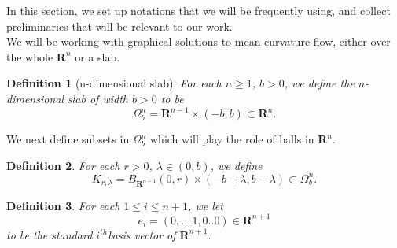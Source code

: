 \documentclass[pdflatex,sn-mathphys-num]{sn-jnl}%
\newtheorem{definition}{Definition}[section]
\begin{document}
In this section, we set up notations that we will be frequently using, and collect preliminaries that will be relevant to our work. \\

We will be working with graphical solutions to mean curvature flow, either over the whole $\mathbf{R}^n$ or a slab. 
\begin{definition}[n-dimensional slab]
    For each $n \geq 1$, $b > 0$, we define the $n$-dimensional slab of width $b > 0$ to be
    \begin{equation}
        \Omega^n_b = \mathbf{R}^{n-1}\times (-b,b) \subset \mathbf{R}^{n}.
    \end{equation}
\end{definition}
We next define subsets in $\Omega^n_b$ which will play the role of balls in $\mathbf{R}^n$. 
\begin{definition}\label{Some domains and quantities}
    For each $r > 0$, $\lambda \in (0, b)$, we define
    \begin{equation}\label{definition of domain}
    K_{r, \lambda} = B_{\mathbf{R}^{n-1}}(0, r) \times (-b + \lambda, b - \lambda) \subset \Omega^n_b.
    \end{equation}
\end{definition}
\begin{definition}
For each $1 \leq i \leq n+1$, we let \begin{equation}
    e_i = (0,..,1,0..0) \in \mathbf{R}^{n+1}
\end{equation}
to be the standard $i^{th }$basis vector of $\mathbf{R}^{n+1}$.    
\end{definition}
\end{document}
